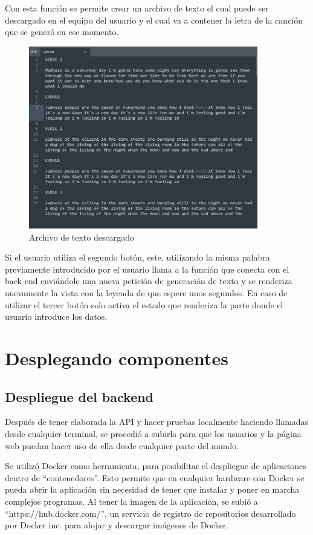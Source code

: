 \documentclass[12pt, a4paper, titlepage]{report}
\begin{document}
Con esta función se permite crear un archivo de texto el cual puede ser descargado en el equipo del usuario y el cual va a contener la letra de la canción que se generó en ese momento.
\begin{figure}[H]
	\includegraphics[width=10cm]{./imagenes/Desarrollo/AplicacionWeb/Archivo.png}
	\centering 
	\caption{Archivo de texto descargado}
\end{figure}	
Si el usuario utiliza el segundo botón, este, utilizando la misma palabra previamente introducido por el usuario llama a la función que conecta con el back-end enviándole una nueva petición de generación de texto y se renderiza nuevamente la vista con la leyenda de que espere unos segundos. En caso de utilizar el tercer botón solo activa el estado que renderiza la parte donde el usuario introduce los datos.
\newpage
\section{Desplegando componentes}

\subsection{Despliegue del backend}
Después de tener elaborada la API y hacer pruebas localmente haciendo llamadas desde cualquier terminal, se procedió a subirla para que los usuarios y la página web puedan hacer uso de ella desde cualquier parte del mundo.

Se utilizó Docker como herramienta, para posibilitar el despliegue de aplicaciones dentro de ``contenedores''. Esto permite que en cualquier hardware con Docker se pueda abrir la aplicación sin necesidad de tener que instalar y poner en marcha complejos programas. Al tener la imagen de la aplicación, se subió a  ``https://hub.docker.com/'', un servicio de registro de repositorios desarrollado por Docker inc. para alojar y descargar imágenes de Docker.
\end{document}
